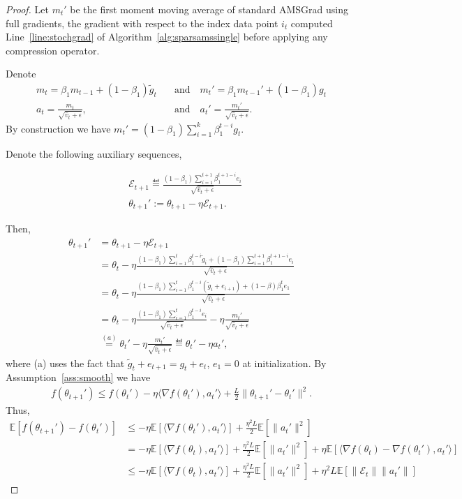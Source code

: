 \documentclass[11pt]{article}
\begin{document}
\begin{proof}
Let $m_t'$ be the first moment moving average of standard AMSGrad using full gradients, \ie the gradient with respect to the index data point $i_t$ computed Line~\ref{line:stochgrad} of Algorithm~\ref{alg:sparsamssingle} before applying any compression operator.

Denote
\begin{align*}
m_t=\beta_1 m_{t-1}+(1-\beta_1)\tilde g_t \quad & \textrm{and} \quad m_t'=\beta_1 m_{t-1}'+(1-\beta_1) g_t\\
    a_t=\frac{m_t}{\sqrt{\hat v_t+\epsilon}},\quad & \textrm{and} \quad  a_t'=\frac{m_t'}{\sqrt{\hat v_t+\epsilon}}.
\end{align*}
By construction we have $m_t'=(1-\beta_1)\sum_{i=1}^k\beta_1^{t-i} g_t$. 

Denote the following auxiliary sequences,

\begin{align*}
& \mathcal E_{t+1}\eqdef \frac{(1-\beta_1)\sum_{i=1}^{t+1} \beta_1^{t+1-i} e_i}{\sqrt{\hat v_t+\epsilon}}\\
&\theta_{t+1}':=\theta_{t+1}-\eta\mathcal E_{t+1}.
\end{align*}

Then, 
\begin{align*}
    \theta_{t+1}'&=\theta_{t+1}-\eta\mathcal E_{t+1}\\
    &=\theta_t-\eta\frac{(1-\beta_1)\sum_{i=1}^{t} \beta_1^{t-i}\tilde g_i+(1-\beta_1)\sum_{i=1}^{t+1} \beta_1^{t+1-i}e_i}{\sqrt{\hat v_t+\epsilon}}\\
    &=\theta_t-\eta\frac{(1-\beta_1)\sum_{i=1}^{t} \beta_1^{t-i}(\tilde g_i+e_{i+1})+(1-\beta)\beta_1^t e_1}{\sqrt{\hat v_t+\epsilon}}\\
    &=\theta_t-\eta\frac{(1-\beta_1)\sum_{i=1}^{t} \beta_1^{t-i} e_i}{\sqrt{\hat v_t+\epsilon}}-\eta\frac{m_t'}{\sqrt{\hat v_t+\epsilon}}\\
    &\overset{(a)}{=}\theta_t'-\eta\frac{m_t'}{\sqrt{\hat v_t+\epsilon}}\eqdef \theta_t'-\eta a_t',
\end{align*}
where (a) uses the fact that $\tilde g_t+e_{t+1}=g_t+e_t$, $e_1=0$ at initialization. By Assumption~\ref{ass:smooth} we have
\begin{align*}
    f(\theta_{t+1}')\leq f(\theta_t')-\eta\langle \nabla f(\theta_t'), a_t'\rangle+\frac{L}{2}\| \theta_{t+1}'-\theta_t'\|^2.
\end{align*}
Thus,
\begin{align}
    \mathbb E[f(\theta_{t+1}')-f(\theta_t')]&\leq -\eta\mathbb E[\langle \nabla f(\theta_t'), a_t'\rangle]+\frac{\eta^2L}{2}\mathbb E[\|a_t'\|^2]\\
    &=-\eta\mathbb E[\langle \nabla f(\theta_t), a_t'\rangle]+\frac{\eta^2L}{2}\mathbb E[\|a_t'\|^2]+\eta\mathbb E[\langle \nabla f(\theta_t)-\nabla f(\theta_t'),a_t'\rangle]\\
    &\leq -\eta\mathbb E[\langle \nabla f(\theta_t), a_t'\rangle]+\frac{\eta^2L}{2}\mathbb E[\|a_t'\|^2]+\eta^2 L\mathbb E[\| \mathcal E_t\| \|a_t'\|] \label{eq0}
\end{align}


\end{proof}
\end{document}
